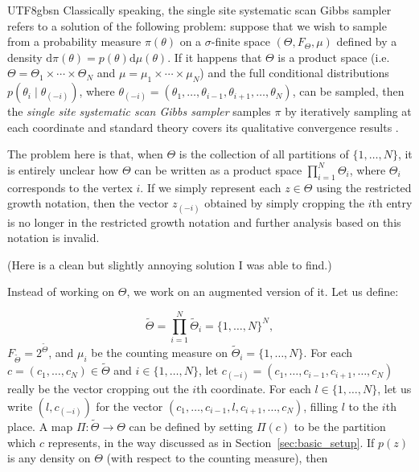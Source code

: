 \documentclass[12pt]{report}
\theoremstyle{plain}
\theoremstyle{definition}
\begin{document}
\begin{CJK*}{UTF8}{gbsn}
Classically speaking, the single site systematic scan Gibbs sampler
refers to a solution of the following problem:
suppose that we wish to sample 
from a probability measure $\pi(\theta)$
on a $\sigma$-finite space $(\Theta, F_{\Theta}, \mu)$
defined by a density $\mathrm{d}\pi(\theta) = p(\theta) \mathrm{d}\mu(\theta)$.
If it happens that $\Theta$ is a product space (i.e. $ \Theta= \Theta_1 \times \cdots \times \Theta_N$
and $\mu = \mu_1 \times \cdots \times \mu_N$)
and the full conditional distributions $p(\theta_i \mid \theta_{(-i)})$,
where $\theta_{(-i)} = (\theta_1, \ldots, \theta_{i-1}, \theta_{i+1}, \ldots, \theta_N)$,
can be sampled,
then the \textit{single site systematic scan Gibbs sampler}
samples $\pi$ by iteratively sampling at each coordinate 
and standard theory covers its qualitative convergence results
\cite{Robert_Casella_2004}.

The problem here is that, when $\Theta$ is the collection of all partitions 
of $\{1, \ldots, N\}$, it is entirely unclear how $\Theta$ can be written as a product space
$\prod_{i=1}^N \Theta_i$, where $\Theta_i$ corresponds to the vertex $i$.
If we simply represent each $z \in \Theta$ using the restricted growth notation,
then the vector $z_{(-i)}$ obtained by simply cropping the $i$th entry 
is no longer in the restricted growth notation and further analysis based 
on this notation is invalid.

(Here is a clean but slightly annoying solution I was able to find.)

Instead of working on $\Theta$, we work on an augmented version of it.
Let us define:

\begin{equation*}
  \tilde{\Theta} = \prod_{i=1}^{N} \tilde{\Theta}_i = \{1, \ldots, N\}^N,
\end{equation*}
$F_{\tilde{\Theta}} = 2^{\tilde{\Theta}}$,
and 
$\mu_i$ be the counting measure on $\tilde{\Theta}_i = \{1, \ldots, N\}$.
For each $c = (c_1, \ldots, c_N) \in \tilde{\Theta}$
and $i \in \{1, \ldots, N\}$,
let $c_{(-i)} = (c_1, \ldots, c_{i-1}, c_{i+1}, \ldots, c_N)$
really be the vector cropping out the $i$th coordinate.
For each $l \in \{1, \ldots, N\}$,
let us write $(l, c_{(-i)})$ for the vector $(c_1, \ldots, c_{i-1},l, c_{i+1}, \ldots, c_N)$,
filling $l$ to the $i$th place.
A map $\Pi : \tilde{\Theta} \to \Theta$ can be defined 
by setting $\Pi(c)$ to be the partition which $c$ represents,
in the way discussed as in Section~\ref{sec:basic_setup}.
If $p(z)$ is any density on $\Theta$ (with respect to the counting measure),
then 


\end{CJK*}
\end{document}
